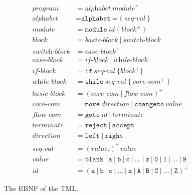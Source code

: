 \documentclass{article}
\theoremstyle{definition}
\begin{document}
    \begin{figure}[htb]
        \centering
        \begin{align*}
            \textit{program} &= \textit{alphabet} \ \textit{module}^+ \\
            \textit{alphabet} &= \texttt{alphabet} \ \texttt{=} \ \texttt{\{} \ \textit{seq-val} \ \texttt{\}} \\
            \textit{module} &= \texttt{module} \ \textit{id} \ \texttt{\{} \ \textit{block}^+ \ \texttt{\}} \\
            \textit{block} &= \textit{basic-block} \ | \ \textit{switch-block} \\
            \textit{switch-block} &= \textit{case-block}^+ \\
            \textit{case-block} &= \textit{if-block} \ | \ \textit{while-block} \\
            \textit{if-block} &= \texttt{if} \ \textit{seq-val} \ \texttt{\{} \textit{block}^+ \texttt{\}} \\
            \textit{while-block} &= \texttt{while} \ \textit{seq-val} \ \texttt{\{} \ \textit{core-com}^+ \ \texttt{\}} \\
            \textit{basic-block} &= (\textit{core-com} \ | \ \textit{flow-com})^+ \\
            \textit{core-com} &= \texttt{move} \ \textit{direction} \ | \ \texttt{changeto} \ \textit{value} \\
            \textit{flow-com} &= \texttt{goto} \ \textit{id} \ | \ \textit{terminate} \\
            \textit{terminate} &= \texttt{reject} \ | \ \texttt{accept} \\
            \textit{direction} &= \texttt{left} \ | \ \texttt{right} \\
            \textit{seq-val} &= (\textit{value} \texttt{,})^* \ \textit{value} \\
            \textit{value} &= \texttt{blank} \ | \ \texttt{a} \ | \ \texttt{b} \ | \ \texttt{c} \ | \ \dots \ | \ \texttt{z} \ | \ \texttt{0} \ | \ \texttt{1} \ | \ \dots \ | \ \texttt{9} \\
            \textit{id} &= (\texttt{a} \ | \ \texttt{b} \ | \ \texttt{c} \ | \ \dots \ | \ \texttt{z} \ | \ \texttt{A} \ | \ \texttt{B} \ | \ \texttt{C} \ | \ \dots \ | \ \texttt{Z})^+
        \end{align*}
        \caption{The EBNF of the TML.}
        \label{fig:tml_ebnf}
    \end{figure}
    
\end{document}
